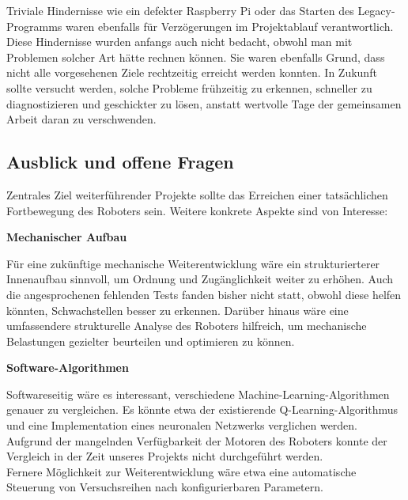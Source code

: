 Triviale Hindernisse wie ein defekter Raspberry Pi oder das Starten des Legacy-\hspace{0px}Programms waren ebenfalls für Verzögerungen im Projektablauf verantwortlich. Diese Hindernisse wurden anfangs auch nicht bedacht, obwohl man mit Problemen solcher Art hätte rechnen können. Sie waren ebenfalls Grund, dass nicht alle vorgesehenen Ziele rechtzeitig erreicht werden konnten. In Zukunft sollte versucht werden, solche Probleme frühzeitig zu erkennen, schneller zu diagnostizieren und geschickter zu lösen, anstatt wertvolle Tage der gemeinsamen Arbeit daran zu verschwenden.

\subsection{Ausblick und offene Fragen}

Zentrales Ziel weiterführender Projekte sollte das Erreichen einer tatsächlichen Fortbewegung des Roboters sein. Weitere konkrete Aspekte sind von Interesse:

\textbf{Mechanischer Aufbau}

Für eine zukünftige mechanische Weiterentwicklung wäre ein strukturierterer Innenaufbau sinnvoll, um Ordnung und Zugänglichkeit weiter zu erhöhen. Auch die angesprochenen fehlenden Tests fanden bisher nicht statt, obwohl diese helfen könnten, Schwachstellen besser zu erkennen. Darüber hinaus wäre eine umfassendere strukturelle Analyse des Roboters hilfreich, um mechanische Belastungen gezielter beurteilen und optimieren zu können.

\textbf{Software-Algorithmen}

Softwareseitig wäre es interessant, verschiedene Machine-Learning-Algorithmen genauer zu vergleichen. Es könnte etwa der existierende Q-Learning-Algorithmus und eine Implementation eines neuronalen Netzwerks verglichen werden. Aufgrund der mangelnden Verfügbarkeit der Motoren des Roboters konnte der Vergleich in der Zeit unseres Projekts nicht durchgeführt werden. \\ Fernere Möglichkeit zur Weiterentwicklung wäre etwa eine automatische Steuerung von Versuchsreihen nach konfigurierbaren Parametern. 
